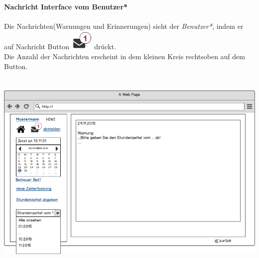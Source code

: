\newpage
\textbf{\\Nachricht Interface vom Benutzer*}\\
\\
Die Nachrichten(Warnungen und Erinnerungen) sieht der \emph{Benutzer*}, indem er auf Nachricht Button
\includegraphics[scale=.8]{UI/Button/Nachricht.png} drückt.\\
Die Anzahl der Nachrichten erscheint in dem kleinen Kreis rechtsoben auf dem Button.\\
\\
\\
\includegraphics[width=\linewidth]{UI/Benutzer/Nachricht.png}

\newpage
